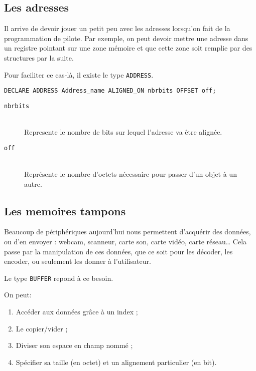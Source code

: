 \documentclass{rtxreport}
\begin{document}
\subsection{Les adresses}

Il arrive de devoir jouer un petit peu avec les adresses lorsqu'on fait de la programmation de pilote.
Par exemple, on peut devoir mettre une adresse dans un registre pointant sur une zone mémoire
et que cette zone soit remplie par des structures par la suite.

Pour faciliter ce cas-là, il existe le type \texttt{ADDRESS}.

\begin{lstlisting}[caption=Instanciation d'une adresse]
DECLARE ADDRESS Address_name ALIGNED_ON nbrbits OFFSET off;
\end{lstlisting}

\begin{description}
\item[\texttt{nbrbits}] \hfill \\
	Represente le nombre de bits sur lequel l'adresse va être alignée.
\item[\texttt{off}] \hfill \\
	Représente le nombre d'octets nécessaire pour passer d'un objet à un autre.
\end{description}


\subsection{Les memoires tampons}
Beaucoup de périphériques aujourd’hui nous permettent d’acquérir des données,
ou d’en envoyer : webcam, scanneur, carte son, carte vidéo, carte réseau\ldots
Cela passe par la manipulation de ces données, que ce soit pour les décoder,
les encoder, ou seulement les donner à l’utilisateur.

Le type \texttt{BUFFER} repond à ce besoin.

On peut:
\begin{enumerate}
	\item Accéder aux données grâce à un index ; 
	\item Le copier/vider ; 
	\item Diviser son espace en champ nommé ; 
	\item Spécifier sa taille (en octet) et un alignement particulier (en bit).
\end{enumerate}
\end{document}
